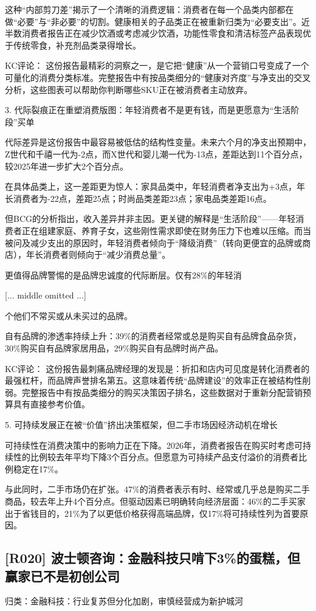\documentclass[11pt]{ctexart}
\begin{document}
这种“内部剪刀差”揭示了一个清晰的消费逻辑：消费者在每一个品类内部都在做“必要”与“非必要”的切割。健康相关的子品类正在被重新归类为“必要支出”。近半数消费者报告正在减少饮酒或考虑减少饮酒，功能性零食和清洁标签产品表现优于传统零食，补充剂品类录得增长。

KC评论： 这份报告最精彩的洞察之一，是它把“健康”从一个营销口号变成了一个可量化的消费分类标准。完整报告中有按品类细分的“健康对齐度”与净支出的交叉分析，这些图表可以帮助你判断哪些SKU正在被消费者主动放弃。

3. 代际裂痕正在重塑消费版图：年轻消费者不是更有钱，而是更愿意为“生活阶段”买单

代际差异是这份报告中最容易被低估的结构性变量。未来六个月的净支出预期中，Z世代和千禧一代为-2点，而X世代和婴儿潮一代为-13点，差距达到11个百分点，较2025年进一步扩大2个百分点。

在具体品类上，这一差距更为惊人：家具品类中，年轻消费者净支出为+3点，年长消费者为-22点，差距25点；时尚品类差距23点；家电品类差距16点。

但BCG的分析指出，收入差异并非主因。更关键的解释是“生活阶段”——年轻消费者正在组建家庭、养育子女，这些刚性需求即使在财务压力下也难以压缩。而当被问及减少支出的原因时，年轻消费者倾向于“降级消费”（转向更便宜的品牌或商店），年长消费者则倾向于“减少消费总量”。

更值得品牌警惕的是品牌忠诚度的代际断层。仅有28\%的年轻消

[... middle omitted ...]

个他们不常买或从未买过的品牌。

自有品牌的渗透率持续上升：39\%的消费者经常或总是购买自有品牌食品杂货，30\%购买自有品牌家居用品，29\%购买自有品牌时尚产品。

KC评论： 这份报告最刺痛品牌经理的发现是：折扣和店内可见度是转化消费者的最强杠杆，而品牌声誉排名第五。这意味着传统“品牌建设”的效率正在被结构性削弱。完整报告中有按品类细分的购买决策因子排名，这些数据对于重新分配营销预算具有直接参考价值。

5. 可持续发展正在被“价值”挤出决策框架，但二手市场因经济动机在增长

可持续性在消费决策中的影响力正在下降。2026年，消费者报告在购买时考虑可持续性的比例较去年平均下降3个百分点。但愿意为可持续产品支付溢价的消费者比例稳定在17\%。

与此同时，二手市场仍在扩张。47\%的消费者表示有时、经常或几乎总是购买二手商品，较去年上升4个百分点。但驱动因素已明确转向经济层面：46\%的二手买家出于省钱目的，21\%为了以更低价格获得高端品牌，仅17\%将可持续性列为首要原因。

\subsection{[R020] 波士顿咨询：金融科技只啃下3\%的蛋糕，但赢家已不是初创公司}
{\small\color{refgray}归类：金融科技：行业复苏但分化加剧，审慎经营成为新护城河}
\end{document}

